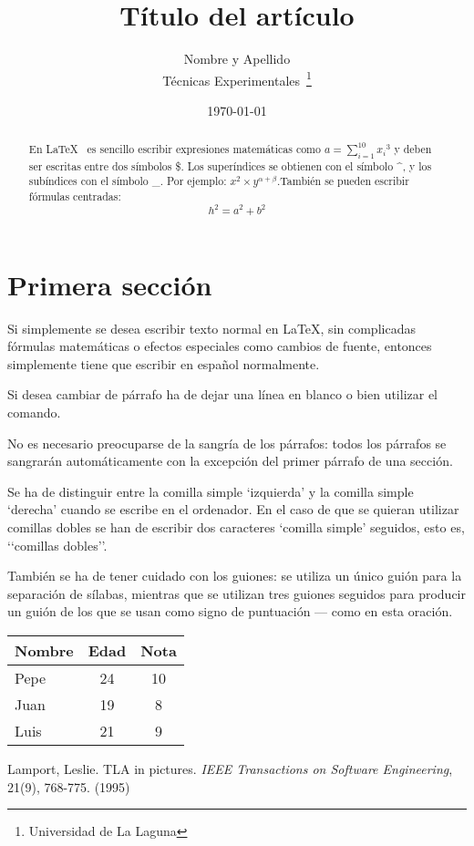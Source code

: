 \documentclass[a4paper,12pt]{article}
\begin{document}
\title{T\'itulo del art\'iculo}
\author{Nombre y Apellido \\
T\'ecnicas Experimentales~\footnote{Universidad de La Laguna}
}
\date{\today}
\maketitle
\begin{abstract}
En \LaTeX{}~\cite{Lam:86} es sencillo escribir expresiones
matem\'aticas como $a=\sum_{i=1}^{10} {x_i}^{3}$
y deben ser escritas entre dos s\'imbolos \$.
Los super\'indices se obtienen con el s\'imbolo \^{}, y
los sub\'indices con el s\'imbolo \_.
Por ejemplo: $x^2 \times y^{\alpha + \beta}$.Tambi\'en se pueden escribir f\'ormulas centradas:
\[h^2=a^2 + b^2 \]
\end{abstract}

\section{Primera secci\'on}
Si simplemente se desea escribir texto normal en LaTeX,
sin complicadas f\'ormulas matem\'aticas o efectos especiales
como cambios de fuente, entonces simplemente tiene que escribir
en espa\~nol normalmente.\par
Si desea cambiar de párrafo ha de dejar una línea en blanco o bien
utilizar el comando. \par 
No es necesario preocuparse de la sangr\'ia de los párrafos:
todos los p\'arrafos se sangrar\'an autom\'aticamente con la excepci\'on
del primer p\'arrafo de una secci\'on. 

Se ha de distinguir entre la comilla simple ‘izquierda’
y la comilla simple ‘derecha’ cuando se escribe en el ordenador.
En el caso de que se quieran utilizar comillas dobles se han de
escribir dos caracteres ‘comilla simple’ seguidos, esto es,
‘‘comillas dobles’’.

Tambi\'en se ha de tener cuidado con los guiones: se utiliza un \'unico
gui\'on para la separaci\'on de s\'ilabas, mientras que se utilizan
tres guiones seguidos para producir un gui\'on de los que se usan
como signo de puntuaci\'on --- como en esta oraci\'on. \par
\bigskip
\begin{tabular}{|l|c|c|}
\hline
Nombre & Edad & Nota \\ \hline
Pepe & 24 & 10 \\ \hline
Juan & 19 & 8 \\ \hline
Luis & 21 & 9 \\ \hline
\end{tabular}
\begin{thebibliography}{00}
Lamport, Leslie.
TLA in pictures.
\emph{IEEE Transactions on Software Engineering},
21(9), 768-775.
(1995)
\end{thebibliography}
\end{document}
